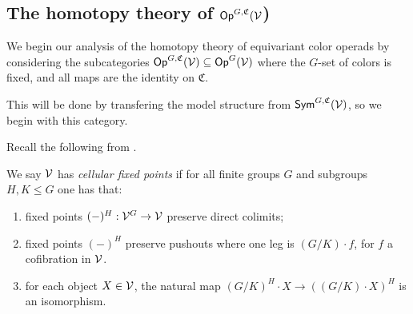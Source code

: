 \documentclass[a4paper,10pt
,draft
]{article}%
\renewcommand{\1}{\eta}%
\begin{document}


 
\subsection{The homotopy theory of $\mathsf{Op}^{G, \mathfrak C}(\mathcal V$)}

We begin our analysis of the homotopy theory of equivariant color operads by
considering the subcategories $\mathsf{Op}^{G, \mathfrak C}(\mathcal V) \subseteq \mathsf{Op}^G(\mathcal V)$
where the $G$-set of colors is fixed, and all maps are the identity on $\mathfrak C$.

This will be done by transfering the model structure from $\mathsf{Sym}^{G, \mathfrak C}(\mathcal V)$, so we begin with this category.

Recall the following from \cite{Ste16, BP_geo}.
\begin{definition}
      \label{CELLFP_DEF}
      We say $\mathcal V$ has \textit{cellular fixed points} if
      for all finite groups $G$ and subgroups $H, K \leq G$ one has that:
      \begin{enumerate}[label = (\roman*)]
      \item fixed points $(-)^H: \mathcal V^G \to \mathcal V$ preserve direct colimits;
      \item fixed points $(-)^H$ preserve pushouts where one leg is $(G/K) \cdot f$, for $f$ a cofibration in $\mathcal V$.
      \item for each object $X \in \mathcal V$, the natural map $(G/K)^H \cdot X \to ((G/K) \cdot X)^H$ is an isomorphism.
      \end{enumerate}
\end{definition}
\end{document}
